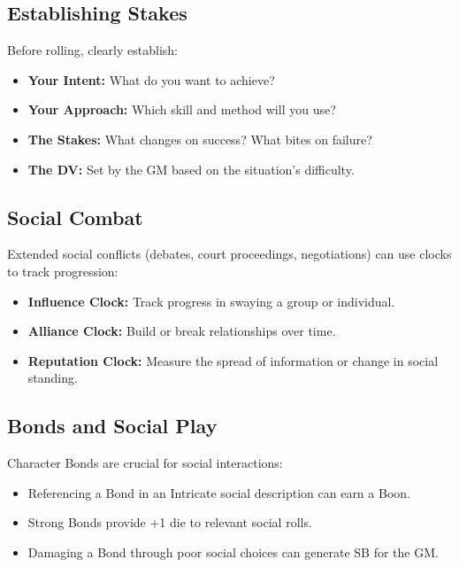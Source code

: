 \subsection*{Establishing Stakes}

Before rolling, clearly establish:
\begin{itemize}
  \item \textbf{Your Intent:} What do you want to achieve?
  \item \textbf{Your Approach:} Which skill and method will you use?
  \item \textbf{The Stakes:} What changes on success? What bites on failure?
  \item \textbf{The DV:} Set by the GM based on the situation's difficulty.
\end{itemize}

\subsection*{Social Combat}

Extended social conflicts (debates, court proceedings, negotiations) can use clocks to track progression:
\begin{itemize}
  \item \textbf{Influence Clock:} Track progress in swaying a group or individual.
  \item \textbf{Alliance Clock:} Build or break relationships over time.
  \item \textbf{Reputation Clock:} Measure the spread of information or change in social standing.
\end{itemize}

\subsection*{Bonds and Social Play}

Character Bonds are crucial for social interactions:
\begin{itemize}
  \item Referencing a Bond in an Intricate social description can earn a Boon.
  \item Strong Bonds provide +1 die to relevant social rolls.
  \item Damaging a Bond through poor social choices can generate SB for the GM.
\end{itemize}


